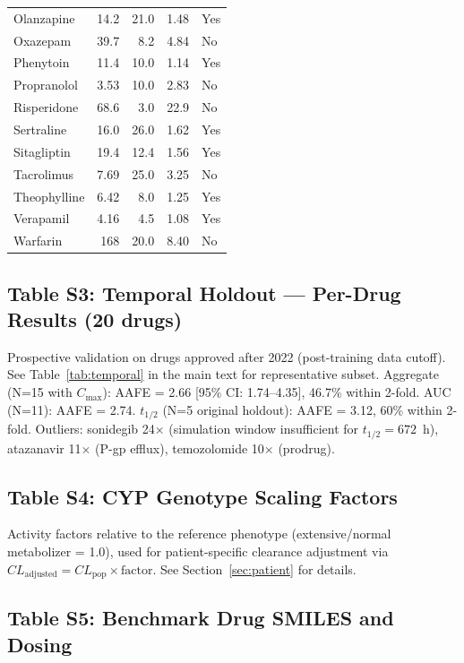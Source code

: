 \documentclass[review,3p]{elsarticle}
\begin{document}
\begin{table}[H]
\begin{tabular}{lrrrl}
Olanzapine & 14.2 & 21.0 & 1.48 & Yes \\
Oxazepam & 39.7 & 8.2 & 4.84 & No \\
Phenytoin & 11.4 & 10.0 & 1.14 & Yes \\
Propranolol & 3.53 & 10.0 & 2.83 & No \\
Risperidone & 68.6 & 3.0 & 22.9 & No \\
Sertraline & 16.0 & 26.0 & 1.62 & Yes \\
Sitagliptin & 19.4 & 12.4 & 1.56 & Yes \\
Tacrolimus & 7.69 & 25.0 & 3.25 & No \\
Theophylline & 6.42 & 8.0 & 1.25 & Yes \\
Verapamil & 4.16 & 4.5 & 1.08 & Yes \\
Warfarin & 168 & 20.0 & 8.40 & No \\
\bottomrule
\end{tabular}
\end{table}

\subsection*{Table S3: Temporal Holdout --- Per-Drug Results (20 drugs)}
\label{tab:s3}

Prospective validation on drugs approved after 2022 (post-training data cutoff). See Table~\ref{tab:temporal} in the main text for representative subset. Aggregate (N=15 with $C_{\max}$): AAFE = 2.66 [95\% CI: 1.74--4.35], 46.7\% within 2-fold. AUC (N=11): AAFE = 2.74. $t_{1/2}$ (N=5 original holdout): AAFE = 3.12, 60\% within 2-fold. Outliers: sonidegib 24$\times$ (simulation window insufficient for $t_{1/2}=672$~h), atazanavir 11$\times$ (P-gp efflux), temozolomide 10$\times$ (prodrug).

\subsection*{Table S4: CYP Genotype Scaling Factors}
\label{tab:s4}

Activity factors relative to the reference phenotype (extensive/normal metabolizer = 1.0), used for patient-specific clearance adjustment via $CL_{\text{adjusted}} = CL_{\text{pop}} \times \text{factor}$. See Section~\ref{sec:patient} for details.

\subsection*{Table S5: Benchmark Drug SMILES and Dosing}
\label{tab:s5}
\end{document}
